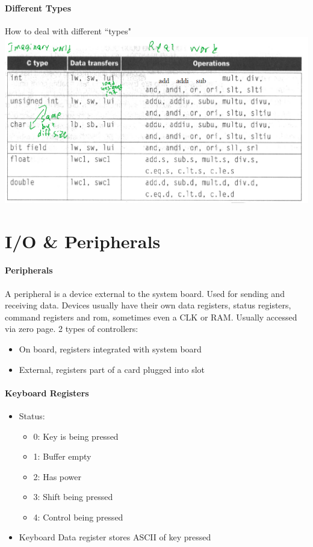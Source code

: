\documentclass[12 pt]{article}
\begin{document}
\paragraph{Different Types} How to deal with different ``types" \\ \includegraphics[scale=0.7]{typ}
\section{I/O \& Peripherals}
\paragraph{Peripherals} A peripheral is a device external to the system board. Used for sending and receiving data.
Devices usually have their own data registers, status registers, command registers and rom, sometimes even a CLK or RAM. Usually accessed via zero page.
2 types of controllers:
\begin{itemize}
\item On board, registers integrated with system board
\item External, registers part of a card plugged into slot
\end{itemize}
\paragraph{Keyboard Registers}
\begin{itemize}
\item Status:
\begin{itemize}
\item 0: Key is being pressed
\item 1: Buffer empty
\item 2: Has power
\item 3: Shift being pressed
\item 4: Control being pressed
\end{itemize}
\item Keyboard Data register stores ASCII of key pressed
\end{itemize}
\end{document}
